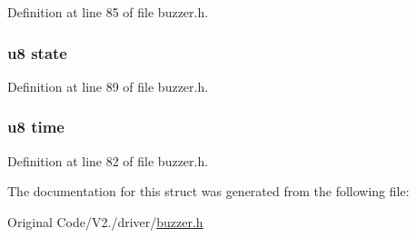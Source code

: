 \-Definition at line 85 of file buzzer.\-h.

\hypertarget{structbuzzer_ad0bc4e4e6e6ffc52d9079b73afd73887}{
\subsubsection[{state}]{\setlength{\rightskip}{0pt plus 5cm}u8 {\bf state}}}\label{structbuzzer_ad0bc4e4e6e6ffc52d9079b73afd73887}


\-Definition at line 89 of file buzzer.\-h.

\hypertarget{structbuzzer_a71f347517c3a3ac0fce4cab20925eb10}{
\subsubsection[{time}]{\setlength{\rightskip}{0pt plus 5cm}u8 {\bf time}}}\label{structbuzzer_a71f347517c3a3ac0fce4cab20925eb10}


\-Definition at line 82 of file buzzer.\-h.



\-The documentation for this struct was generated from the following file\-:\begin{DoxyCompactItemize}
\item 
\-Original Code/\-V2./driver/\hyperlink{buzzer_8h}{buzzer.\-h}\end{DoxyCompactItemize}
